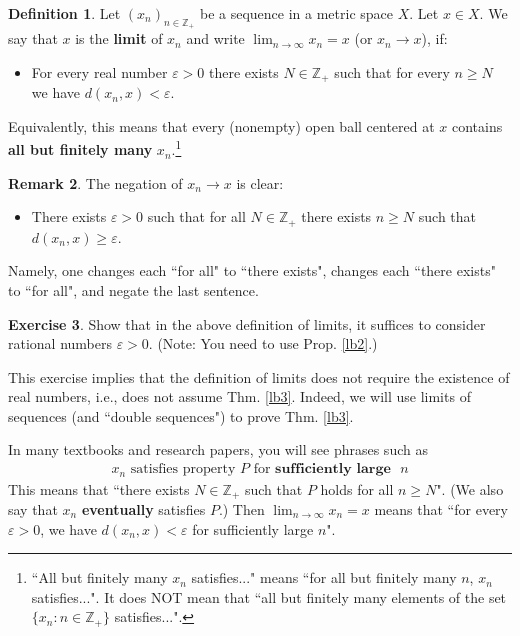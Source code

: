 \documentclass[12pt,b5paper,notitlepage]{article}
\theoremstyle{definition}
\newtheorem{df}{Definition}[section]
\newtheorem{exe}[df]{Exercise}
\newtheorem{rem}[df]{Remark}
\theoremstyle{plain}
\newcommand{\Zbb}{\mathbb Z}
\newcommand{\eps}{\varepsilon}
\numberwithin{equation}{section}
\begin{document}
\begin{df}
Let $(x_n)_{n\in\Zbb_+}$ be a sequence in a metric space $X$. Let $x\in X$. We say that $x$ is the \textbf{limit} of $x_n$ and write $\displaystyle\lim_{n\rightarrow\infty}x_n=x$ (or $x_n\rightarrow x$), if:
\begin{itemize}
\item For every real number $\varepsilon>0$ there exists $N\in\Zbb_+$ such that for every $n\geq N$ we have $d(x_n,x)<\varepsilon$. 
\end{itemize}
Equivalently, this means that every (nonempty) open ball centered at $x$ contains \textbf{all but finitely many}  $x_n$.\footnote{``All but finitely many $x_n$ satisfies..." means ``for all but finitely many $n$, $x_n$ satisfies...". It does NOT mean that ``all but finitely many elements of the set $\{x_n:n\in\Zbb_+\}$ satisfies...".} 
\end{df}

\begin{rem}\label{lb100}
The negation of $x_n\rightarrow x$ is clear: 
\begin{itemize}
\item There exists $\eps>0$ such that for all $N\in\Zbb_+$ there exists $n\geq N$ such that $d(x_n,x)\geq\eps$.
\end{itemize}
Namely, one changes each ``for all" to ``there exists", changes each ``there exists" to ``for all", and negate the last sentence.
\end{rem}


\begin{exe}
Show that in the above definition of limits,  it suffices to consider rational numbers $\varepsilon>0$. (Note: You need to use Prop. \ref{lb2}.) 
\end{exe}
This exercise implies that the definition of limits does not require the existence of real numbers, i.e., does not assume Thm. \ref{lb3}. Indeed, we will use limits of sequences (and ``double sequences") to prove Thm. \ref{lb3}.


In many textbooks and research papers, you will see phrases such as 
\begin{gather}
\text{$x_n$ satisfies property $P$ for } \textbf{sufficiently large} \text{ $n$}
\end{gather}
This means that ``there exists $N\in\Zbb_+$ such that $P$ holds for all $n\geq N$". (We also say that $x_n$ \textbf{eventually} satisfies $P$.) Then $\lim_{n\rightarrow\infty} x_n=x$ means that ``for every $\varepsilon>0$, we have $d(x_n,x)<\varepsilon$ for sufficiently large $n$". 
\end{document}
